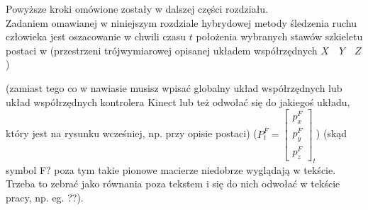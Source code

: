 Powyższe kroki omówione zostały w dalszej części rozdziału.\\

Zadaniem omawianej w niniejszym rozdziale hybrydowej metody śledzenia ruchu człowieka jest oszacowanie w chwili czasu $t$ położenia wybranych stawów szkieletu postaci w (przestrzeni trójwymiarowej opisanej układem współrzędnych $X\quad Y\quad Z$)

(zamiast tego co w nawiasie musisz wpisać globalny układ współrzędnych lub układ współrzędnych kontrolera Kinect lub też odwołać się do jakiegoś układu, który jest na rysunku wcześniej, np. przy opisie postaci) ($P^F_t = \begin{bmatrix}p^F_x\\p^F_y\\p^F_z\end{bmatrix}_t$) (skąd symbol F? poza tym takie pionowe macierze niedobrze wyglądają w tekście. Trzeba to zebrać jako równania poza tekstem i się do nich odwołać w tekście pracy, np. eg. ??). 


